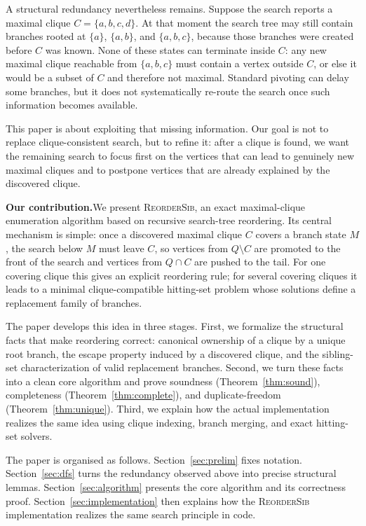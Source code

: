 \documentclass[sigconf, nonacm]{acmart}
\theoremstyle{definition}
\theoremstyle{remark}
\begin{document}
\smallskip

A structural redundancy nevertheless remains.  Suppose the search reports a
maximal clique $C = \{a,b,c,d\}$.  At that moment the search tree may still
contain branches rooted at $\{a\}$, $\{a,b\}$, and $\{a,b,c\}$, because those
branches were created before $C$ was known.  None of these states can terminate
inside $C$: any new maximal clique reachable from $\{a,b,c\}$ must contain a
vertex outside $C$, or else it would be a subset of $C$ and therefore not
maximal.  Standard pivoting can delay some branches, but it does not
systematically re-route the search once such information becomes available.

This paper is about exploiting that missing information.  Our goal is not to
replace clique-consistent search, but to refine it: after a clique is found, we
want the remaining search to focus first on the vertices that can lead to
genuinely new maximal cliques and to postpone vertices that are already
explained by the discovered clique.

\smallskip

\noindent\textbf{Our contribution.}\quad We present \textsc{ReorderSib}, an
exact maximal-clique enumeration algorithm based on recursive search-tree
reordering.  Its central mechanism is simple: once a discovered maximal clique
$C$ covers a branch state $M$, the search below $M$ must leave $C$, so vertices
from $Q \setminus C$ are promoted to the front of the search and vertices from
$Q \cap C$ are pushed to the tail.  For one covering clique this gives an
explicit reordering rule; for several covering cliques it leads to a minimal
clique-compatible hitting-set problem whose solutions define a replacement
family of branches.

The paper develops this idea in three stages.  First, we formalize the
structural facts that make reordering correct: canonical ownership of a clique
by a unique root branch, the escape property induced by a discovered clique,
and the sibling-set characterization of valid replacement branches.  Second, we
turn these facts into a clean core algorithm and prove soundness
(Theorem~\ref{thm:sound}), completeness (Theorem~\ref{thm:complete}), and
duplicate-freedom (Theorem~\ref{thm:unique}).  Third, we explain how the actual
implementation realizes the same idea using clique indexing, branch merging,
and exact hitting-set solvers.

The paper is organised as follows.  Section~\ref{sec:prelim} fixes notation.
Section~\ref{sec:dfs} turns the redundancy observed above into precise
structural lemmas.  Section~\ref{sec:algorithm} presents the core algorithm and
its correctness proof.  Section~\ref{sec:implementation} then explains how the
\textsc{ReorderSib} implementation realizes the same search principle in code.
\end{document}
